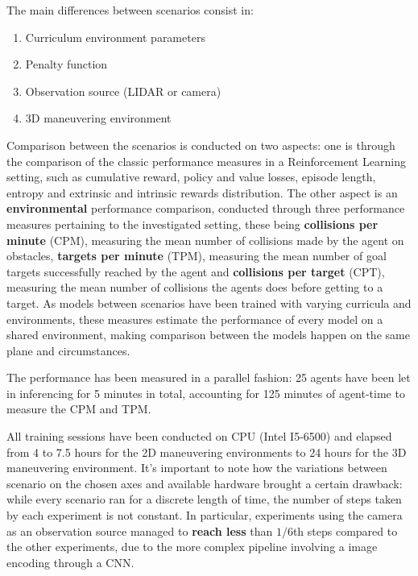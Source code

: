 \documentclass{ifacconf}
\begin{document}
The main differences between scenarios consist in:
\begin{enumerate}
    \item Curriculum environment parameters
    \item Penalty function
    \item Observation source (LIDAR or camera)
    \item 3D maneuvering environment
\end{enumerate}

Comparison between the scenarios is conducted on two aspects: one is through the comparison of the classic performance measures in a Reinforcement Learning setting, such as cumulative reward, policy and value losses, episode length, entropy and extrinsic and intrinsic rewards distribution.
The other aspect is an \textbf{environmental} performance comparison, conducted through three performance measures pertaining to the investigated setting, these being \textbf{collisions per minute} (CPM), measuring the mean number of collisions made by the agent on obstacles, \textbf{targets per minute} (TPM), measuring the mean number of goal targets successfully reached by the agent and \textbf{collisions per target} (CPT), measuring the mean number of collisions the agents does before getting to a target. As models between scenarios have been trained with varying curricula and environments, these measures estimate the performance of every model on a shared environment, making comparison between the models happen on the same plane and circumstances.

The performance has been measured in a parallel fashion: 25 agents have been let in inferencing for 5 minutes in total, accounting for 125 minutes of agent-time to measure the CPM and TPM.

All training sessions have been conducted on CPU (Intel I5-6500) and elapsed from 4 to 7.5 hours for the 2D maneuvering environments to 24 hours for the 3D maneuvering environment.
It's important to note how the variations between scenario on the chosen axes and available hardware brought a certain drawback: while every scenario ran for a discrete length of time, the number of steps taken by each experiment is not constant. In particular, experiments using the camera as an observation source managed to \textbf{reach less} than $1/6$th steps compared to the other experiments, due to the more complex pipeline involving a image encoding through a CNN.
\end{document}
